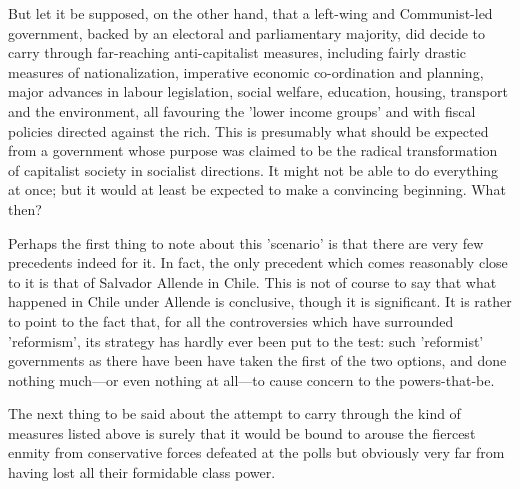 But let it be supposed, on the other hand, that a left\hyp{}wing and Communist\hyp{}led government, backed by an electoral and parliamentary majority, did decide to carry through far\hyp{}reaching anti\hyp{}capitalist measures, including fairly drastic measures of nationalization, imperative economic co\hyp{}ordination and planning, major advances in labour legislation, social welfare, education, housing, transport and the environment, all favouring the 'lower income groups' and with fiscal policies directed against the rich. This is presumably what should be expected from a government whose purpose was claimed to be the radical transformation of capitalist society in socialist directions. It might not be able to do everything at once; but it would at least be expected to make a convincing beginning. What then?

Perhaps the first thing to note about this 'scenario' is that there are very few precedents indeed for it. In fact, the only precedent which comes reasonably close to it is that of Salvador Allende in Chile. This is not of course to say that what happened in Chile under Allende is conclusive, though it is significant. It is rather to point to the fact that, for all the controversies which have surrounded 'reformism', its strategy has hardly ever been put to the test: such 'reformist' governments as there have been have taken the first of the two options, and done nothing much—or even nothing at all—to cause concern to the powers-that-be.

The next thing to be said about the attempt to carry through the kind of measures listed above is surely that it would be bound to arouse the fiercest enmity from conservative forces defeated at the polls but obviously very far from having lost all their formidable class power.


